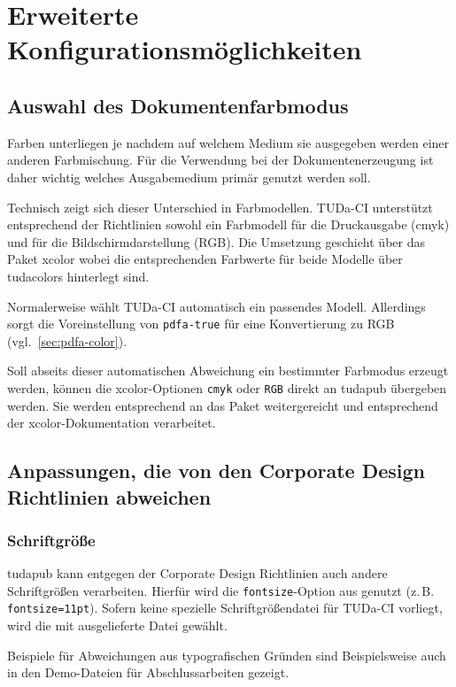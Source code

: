 \documentclass[
	german,
	accentcolor=9c,%
	]{tudapub}
\let\code\texttt
\let\pck\textsf
\let\cls\textsf
\begin{document}
\section{Erweiterte Konfigurationsmöglichkeiten}

\subsection{Auswahl des Dokumentenfarbmodus}
Farben unterliegen je nachdem auf welchem Medium sie ausgegeben werden einer anderen Farbmischung. Für die Verwendung bei der Dokumentenerzeugung ist daher wichtig welches Ausgabemedium primär genutzt werden soll.

Technisch zeigt sich dieser Unterschied in Farbmodellen. TUDa-CI unterstützt entsprechend der Richtlinien sowohl ein Farbmodell für die Druckausgabe (cmyk) und für die Bildschirmdarstellung (RGB). Die Umsetzung geschieht über das Paket \pck{xcolor} wobei die entsprechenden Farbwerte für beide Modelle über \pck{tudacolors} hinterlegt sind.

Normalerweise wählt TUDa-CI automatisch ein passendes Modell. Allerdings sorgt die Voreinstellung von \code{pdfa-true} für eine Konvertierung zu RGB (vgl.~\ref{sec:pdfa-color}).

Soll abseits dieser automatischen Abweichung ein bestimmter Farbmodus erzeugt werden, können die \pck{xcolor}-Optionen \code{cmyk} oder \code{RGB} direkt an \cls{tudapub} übergeben werden. Sie werden entsprechend an das Paket weitergereicht und entsprechend der \pck{xcolor}-Dokumentation verarbeitet.

\subsection{Anpassungen, die von den Corporate Design Richtlinien abweichen}

\subsubsection{Schriftgröße}
\cls{tudapub} kann entgegen der Corporate Design Richtlinien auch andere Schriftgrößen verarbeiten. Hierfür wird die \code{fontsize}-Option aus \KOMAScript{} genutzt (z.\,B. \code{fontsize=11pt}). Sofern keine spezielle Schriftgrößendatei für TUDa-CI vorliegt, wird die mit \KOMAScript{} ausgelieferte Datei gewählt.

Beispiele für Abweichungen aus typografischen Gründen sind Beispielsweise auch in den Demo-Dateien für Abschlussarbeiten gezeigt.
\end{document}
